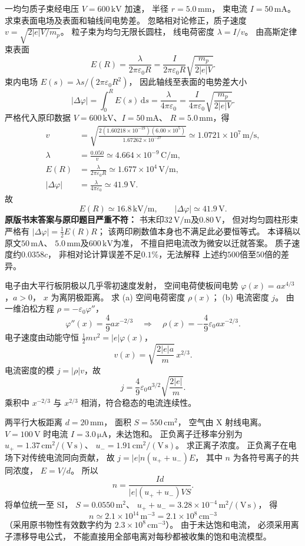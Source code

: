 一均匀质子束经电压
$V=600\,\mathrm{kV}$ 加速，
半径 $r=5.0\,\mathrm{mm}$，
束电流 $I=50\,\mathrm{mA}$。
求束表面电场及表面和轴线间电势差。
\exsolution
忽略相对论修正，质子速度
$v=\sqrt{2|e|V/m_p}$。
粒子束为均匀无限长圆柱，
线电荷密度
$\lambda=I/v$。
由高斯定律束表面
\[
\boxed{E(R)=\frac{\lambda}{2\pi\varepsilon_0R}
=\frac I{2\pi\varepsilon_0R}
\sqrt{\frac{m_p}{2|e|V}}}.
\]
束内电场 $E(s)=\lambda s/
(2\pi\varepsilon_0R^2)$，
因此轴线至表面的电势差大小
\[
\boxed{|\Delta\varphi|=
\int_0^RE(s)\,\mathrm ds
=\frac{\lambda}{4\pi\varepsilon_0}
=\frac I{4\pi\varepsilon_0}
\sqrt{\frac{m_p}{2|e|V}}}.
\]
严格代入原印数据
$V=600\,\mathrm{kV}$、$I=50\,\mathrm{mA}$、
$R=5.0\,\mathrm{mm}$，得
\[
\begin{aligned}
v&=\sqrt{\frac{2(1.60218\times10^{-19})
(6.00\times10^5)}
{1.67262\times10^{-27}}}
\simeq1.0721\times10^7\,\mathrm{m/s},\\
\lambda&=\frac{0.050}{v}
\simeq4.664\times10^{-9}\,\mathrm{C/m},\\
E(R)&=\frac{\lambda}{2\pi\varepsilon_0R}
\simeq1.677\times10^4\,\mathrm{V/m},\\
|\Delta\varphi|&=\frac{\lambda}{4\pi\varepsilon_0}
\simeq41.9\,\mathrm V.
\end{aligned}
\]
故
\[
\boxed{E(R)\simeq16.8\,\mathrm{kV/m},\qquad
|\Delta\varphi|\simeq41.9\,\mathrm V}.
\]
\excheck \textbf{原版书末答案与原印题目严重不符：}
书末印$32\,\mathrm{V/m}$及$0.80\,\mathrm V$，
但对均匀圆柱形束严格有
$|\Delta\varphi|=\tfrac12 E(R)R$；
该两印刷数值本身也不满足此必要恒等式。
本译稿以原文$50\,\mathrm{mA}$、
$5.0\,\mathrm{mm}$及$600\,\mathrm{kV}$为准，
不擅自把电流改为微安以迁就答案。
质子速度约$0.0358c$，
非相对论计算误差不足$0.1\%$，无法解释
上述约$500$倍至$50$倍的差异。

电子由大平行板阴极以几乎零初速度发射，
空间电荷使板间电势
$\varphi(x)=ax^{4/3}$，$a>0$，
$x$ 为离阴极距离。
求 (a) 空间电荷密度 $\rho(x)$；
(b) 电流密度 $j$。
\exsolution
由一维泊松方程
$\rho=-\varepsilon_0\varphi''$，
\[
\varphi''(x)=\frac49ax^{-2/3}
\quad\Longrightarrow\quad
\boxed{\rho(x)=
-\frac49\varepsilon_0ax^{-2/3}}.
\]
电子速度由动能守恒
$\frac12mv^2=|e|\varphi(x)$，
\[
v(x)=\sqrt{\frac{2|e|a}{m}}\,x^{2/3}.
\]
电流密度的模
$j=|\rho|v$，故
\[
\boxed{j=\frac49\varepsilon_0a^{3/2}
\sqrt{\frac{2|e|}{m}}}.
\]
\excheck 乘积中 $x^{-2/3}$ 与 $x^{2/3}$
相消，符合稳态的电流连续性。

两平行大板距离 $d=20\,\mathrm{mm}$，
面积 $S=550\,\mathrm{cm^2}$，
空气由 X 射线电离。
$V=100\,\mathrm V$ 时电流
$I=3.0\,\mathrm{\mu A}$，未达饱和。
正负离子迁移率分别为
$u_+=1.37\,\mathrm{cm^2/(V\,s)}$、
$u_-=1.91\,\mathrm{cm^2/(V\,s)}$。
求正离子浓度。
\exsolution
正负离子在电场下对传统电流同向贡献，
故
$j=|e|n(u_++u_-)E$，
其中 $n$ 为各符号离子的共同浓度，
$E=V/d$。
所以
\[
\boxed{n=\frac{Id}{|e|(u_++u_-)VS}}.
\]
将单位统一至 SI，
$S=0.0550\,\mathrm{m^2}$、
$u_++u_-=3.28\times10^{-4}\,
\mathrm{m^2/(V\,s)}$，
得
\[
\boxed{n\simeq2.1\times10^{14}\,\mathrm{m^{-3}}
=2.1\times10^8\,\mathrm{cm^{-3}}}
\]
（采用原书物性有效数字约为
$2.3\times10^8\,\mathrm{cm^{-3}}$）。
\excheck 由于未达饱和电流，
必须采用离子漂移导电公式，
不能直接用全部电离对每秒都被收集的饱和电流模型。

